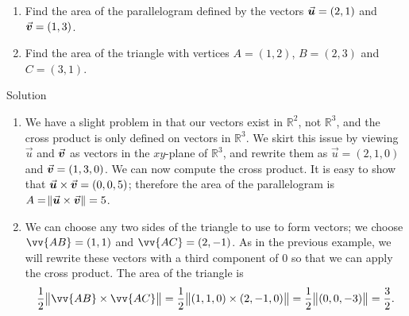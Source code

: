 \begin{example}\label{ex_crossp4}
\begin{enumerate}
	\item Find the area of the parallelogram defined by the vectors $\vecu = \left( 2,1\right)$ and $\vecv = \left( 1,3\right)$.
	\item	Find the area of the triangle with vertices $A=(1,2)$, $B=(2,3)$ and $C=(3,1)$.
\end{enumerate}

\ifanalysis\pagebreak\fi
{}Solution 


\begin{enumerate}
	\item  We have a slight problem in that our vectors exist in $\mathbb{R}^2$, not $\mathbb{R}^3$, and the cross product is only defined on vectors in $\mathbb{R}^3$. We skirt this issue by viewing $\vec u$ and $\vecv$ as vectors in the $xy$-plane of $\mathbb{R}^3$, and rewrite them as $\vec u = \left( 2,1,0\right)$ and $\vecv =\left( 1,3,0\right)$. We can now compute the cross product. 
	It is easy to show that $\crossp uv = \left( 0,0,5\right)$; therefore the area of the parallelogram is $A = \norm{\crossp uv} = 5$.
	
	\item We can choose any two sides of the triangle to use to form vectors; we choose $\vv{AB} = \left( 1,1\right)$ and $\vv{AC}=\left( 2,-1\right)$. As in the previous example, we will rewrite these vectors with a third component of 0 so that we can apply the cross product. The area of the triangle is
$$\frac12\norm{\vv{AB}\times\vv{AC}} = \frac12\norm{\left( 1,1,0\right)\times \left( 2,-1,0\right)} = \frac12\norm{\left( 0,0,-3\right)} = \frac32.$$

	\end{enumerate}
\end{example}



